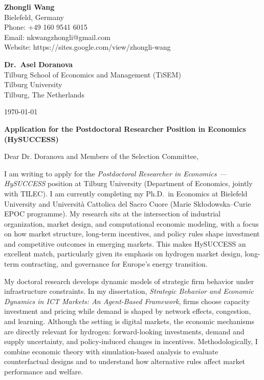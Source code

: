 \documentclass[11pt]{article}
\begin{document}
\begin{flushleft}
\textbf{Zhongli Wang}\\
Bielefeld, Germany\\
Phone: +49 160 9541 6015\\
Email: nkwangzhongli@gmail.com\\
Website: https://sites.google.com/view/zhongli-wang
\end{flushleft}

\vspace{0.3cm}

\begin{flushleft}
\textbf{Dr.\ Asel Doranova}\\
Tilburg School of Economics and Management (TiSEM)\\
Tilburg University\\
Tilburg, The Netherlands
\end{flushleft}

\vspace{0.3cm}

\begin{flushright}
\today
\end{flushright}
\vspace{0.3cm}


\textbf{Application for the Postdoctoral Researcher Position in Economics (HySUCCESS)}\\

\vspace{0.3cm}

Dear Dr. Doranova and Members of the Selection Committee,

I am writing to apply for the \textit{Postdoctoral Researcher in Economics --- HySUCCESS} position at Tilburg University (Department of Economics, jointly with TILEC). I am currently completing my Ph.D.\ in Economics at Bielefeld University and Università Cattolica del Sacro Cuore (Marie Skłodowska--Curie EPOC programme). My research sits at the intersection of industrial organization, market design, and computational economic modeling, with a focus on how market structure, long-term incentives, and policy rules shape investment and competitive outcomes in emerging markets. This makes HySUCCESS an excellent match, particularly given its emphasis on hydrogen market design, long-term contracting, and governance for Europe’s energy transition.

My doctoral research develops dynamic models of strategic firm behavior under infrastructure constraints. In my dissertation, \emph{Strategic Behavior and Economic Dynamics in ICT Markets: An Agent-Based Framework}, firms choose capacity investment and pricing while demand is shaped by network effects, congestion, and learning. Although the setting is digital markets, the economic mechanisms are directly relevant for hydrogen: forward-looking investments, demand and supply uncertainty, and policy-induced changes in incentives. Methodologically, I combine economic theory with simulation-based analysis to evaluate counterfactual designs and to understand how alternative rules affect market performance and welfare.
\end{document}
